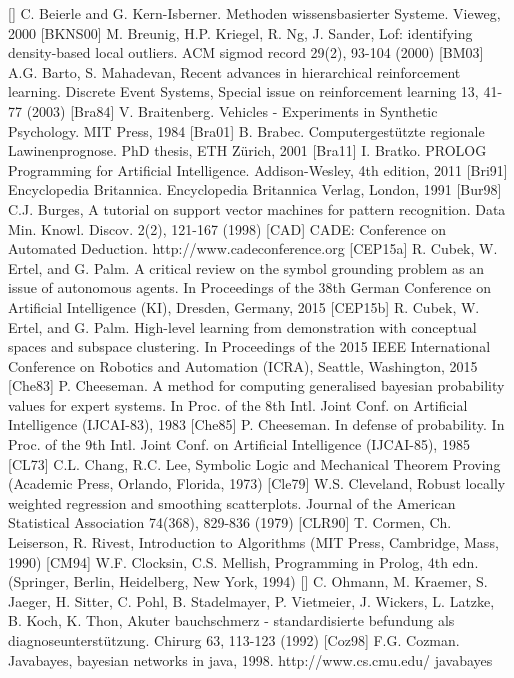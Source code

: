 \documentclass[10pt]{book}
\begin{document}
[\cite{beierle2000methoden}] C. Beierle and G. Kern-Isberner. Methoden wissensbasierter Systeme. Vieweg, 2000
[BKNS00] M. Breunig, H.P. Kriegel, R. Ng, J. Sander, Lof: identifying density-based local outliers. ACM sigmod record 29(2), 93-104 (2000)
[BM03] A.G. Barto, S. Mahadevan, Recent advances in hierarchical reinforcement learning. Discrete Event Systems, Special issue on reinforcement learning 13, 41-77 (2003)
[Bra84] V. Braitenberg. Vehicles - Experiments in Synthetic Psychology. MIT Press, 1984
[Bra01] B. Brabec. Computergestützte regionale Lawinenprognose. PhD thesis, ETH Zürich, 2001
[Bra11] I. Bratko. PROLOG Programming for Artificial Intelligence. Addison-Wesley, 4th edition, 2011
[Bri91] Encyclopedia Britannica. Encyclopedia Britannica Verlag, London, 1991
[Bur98] C.J. Burges, A tutorial on support vector machines for pattern recognition. Data Min. Knowl. Discov. 2(2), 121-167 (1998)
[CAD] CADE: Conference on Automated Deduction. http://www.cadeconference.org
[CEP15a] R. Cubek, W. Ertel, and G. Palm. A critical review on the symbol grounding problem as an issue of autonomous agents. In Proceedings of the 38th German Conference on Artificial Intelligence (KI), Dresden, Germany, 2015
[CEP15b] R. Cubek, W. Ertel, and G. Palm. High-level learning from demonstration with conceptual spaces and subspace clustering. In Proceedings of the 2015 IEEE International Conference on Robotics and Automation (ICRA), Seattle, Washington, 2015
[Che83] P. Cheeseman. A method for computing generalised bayesian probability values for expert systems. In Proc. of the 8th Intl. Joint Conf. on Artificial Intelligence (IJCAI-83), 1983
[Che85] P. Cheeseman. In defense of probability. In Proc. of the 9th Intl. Joint Conf. on Artificial Intelligence (IJCAI-85), 1985
[CL73] C.L. Chang, R.C. Lee, Symbolic Logic and Mechanical Theorem Proving (Academic Press, Orlando, Florida, 1973)
[Cle79] W.S. Cleveland, Robust locally weighted regression and smoothing scatterplots. Journal of the American Statistical Association 74(368), 829-836 (1979)
[CLR90] T. Cormen, Ch. Leiserson, R. Rivest, Introduction to Algorithms (MIT Press, Cambridge, Mass, 1990)
[CM94] W.F. Clocksin, C.S. Mellish, Programming in Prolog, 4th edn. (Springer, Berlin, Heidelberg, New York, 1994)
[\cite{ohmann1992bauchschmerz}] C. Ohmann, M. Kraemer, S. Jaeger, H. Sitter, C. Pohl, B. Stadelmayer, P. Vietmeier, J. Wickers, L. Latzke, B. Koch, K. Thon, Akuter bauchschmerz - standardisierte befundung als diagnoseunterstützung. Chirurg 63, 113-123 (1992)
[Coz98] F.G. Cozman. Javabayes, bayesian networks in java, 1998. http://www.cs.cmu.edu/ javabayes
\end{document}
